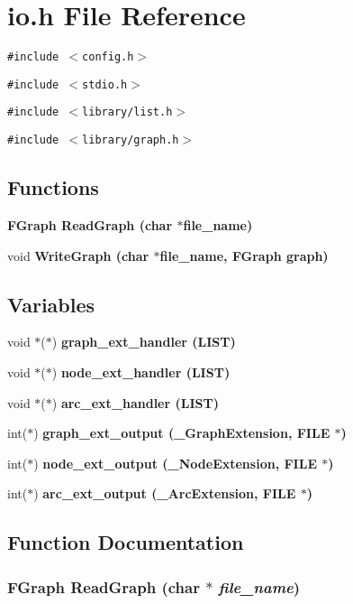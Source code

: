 \section{io.h File Reference}
\label{io_8h}
{\tt \#include $<$config.h$>$}\par
{\tt \#include $<$stdio.h$>$}\par
{\tt \#include $<$library/list.h$>$}\par
{\tt \#include $<$library/graph.h$>$}\par
\subsection*{Functions}
\begin{CompactItemize}
\item 
\bf{FGraph} \bf{Read\-Graph} (char $\ast$file\_\-name)
\item 
void \bf{Write\-Graph} (char $\ast$file\_\-name, \bf{FGraph} \bf{graph})
\end{CompactItemize}
\subsection*{Variables}
\begin{CompactItemize}
\item 
void $\ast$($\ast$) \bf{graph\_\-ext\_\-handler} (\bf{LIST})
\item 
void $\ast$($\ast$) \bf{node\_\-ext\_\-handler} (\bf{LIST})
\item 
void $\ast$($\ast$) \bf{arc\_\-ext\_\-handler} (\bf{LIST})
\item 
int($\ast$) \bf{graph\_\-ext\_\-output} (\bf{\_\-Graph\-Extension}, FILE $\ast$)
\item 
int($\ast$) \bf{node\_\-ext\_\-output} (\bf{\_\-Node\-Extension}, FILE $\ast$)
\item 
int($\ast$) \bf{arc\_\-ext\_\-output} (\bf{\_\-Arc\-Extension}, FILE $\ast$)
\end{CompactItemize}


\subsection{Function Documentation}
\subsubsection{\setlength{\rightskip}{0pt plus 5cm}\bf{FGraph} Read\-Graph (char $\ast$ {\em file\_\-name})}\label{io_8h_60978194a97b6f9773947483638d7653}




